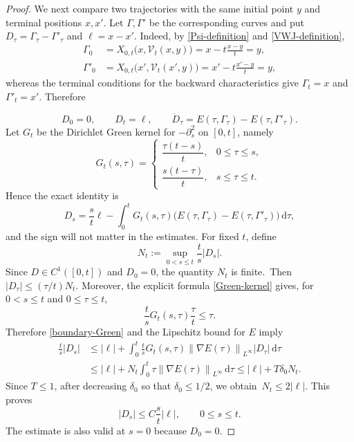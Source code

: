 \documentclass[11pt]{article}
\newcommand{\norm}[1]{\left\lVert #1\right\rVert}
\newcommand{\dd}{\,\mathrm d}
\begin{document}
\begin{proof}
We next compare two trajectories with the same initial point $y$ and terminal
positions $x,x'$.  Let $\Gamma,\Gamma'$ be the corresponding curves and put
$D_\tau=\Gamma_\tau-\Gamma'_\tau$ and $\ell=x-x'$.
Indeed, by \eqref{Psi-definition} and
\eqref{VWJ-definition},
\begin{align*}
 \Gamma_0
 &=X_{0,t}\bigl(x,\mathcal V_t(x,y)\bigr)
   =x-t\frac{x-y}{t}=y,\\
 \Gamma'_0
 &=X_{0,t}\bigl(x',\mathcal V_t(x',y)\bigr)
   =x'-t\frac{x'-y}{t}=y,
\end{align*}
whereas the terminal conditions for the backward characteristics give
$\Gamma_t=x$ and $\Gamma'_t=x'$.  Therefore

\begin{equation*}
 D_0=0,\qquad D_t=\ell,\qquad
 \ddot D_\tau=E(\tau,\Gamma_\tau)-E(\tau,\Gamma'_\tau).
\end{equation*}
Let $G_t$ be the Dirichlet Green kernel for $-\partial_s^2$ on $[0,t]$,
namely
\begin{equation}\label{Green-kernel}
 G_t(s,\tau)=
 \begin{cases}
  \dfrac{\tau(t-s)}{t},&0\leq\tau\leq s,\\[2mm]
  \dfrac{s(t-\tau)}{t},&s\leq\tau\leq t.
 \end{cases}
\end{equation}
Hence the exact identity is
\begin{equation}\label{boundary-Green}
 D_s=\frac{s}{t}\ell-
 \int_0^tG_t(s,\tau)
 \bigl(E(\tau,\Gamma_\tau)-E(\tau,\Gamma'_\tau)\bigr)\dd\tau,
\end{equation}
and the sign will not matter in the estimates.  For fixed $t$, define
\begin{equation*}
 N_t:=\sup_{0<s\leq t}\frac{t}{s}|D_s|.
\end{equation*}
 Since $D\in C^1([0,t])$ and $D_0=0$, the quantity $N_t$ is finite.\
Then $|D_\tau|\leq(\tau/t)N_t$.  Moreover, the explicit formula
\eqref{Green-kernel} gives, for $0<s\leq t$ and $0\leq\tau\leq t$,
\begin{equation*}
 \frac{t}{s}G_t(s,\tau)\frac{\tau}{t}\leq\tau.
\end{equation*}
Therefore \eqref{boundary-Green} and the Lipschitz bound for $E$ imply
 \begin{align*}
 \frac{t}{s}|D_s|
 &\leq |\ell|+\int_0^t\frac{t}{s}G_t(s,\tau)
        \norm{\nabla E(\tau)}_{L^\infty} |D_\tau|\dd\tau\\
 &\leq |\ell|+N_t\int_0^t\tau
        \norm{\nabla E(\tau)}_{L^\infty}\dd\tau
 \leq |\ell|+T\delta_0N_t.
\end{align*} 
 Since $T\leq1$, after decreasing $\delta_0$ so that
$\delta_0\leq1/2$, we obtain\
$N_t\leq2|\ell|$.  This proves
\begin{equation}\label{two-endpoint-position}
 |D_s|\leq C\frac{s}{t}|\ell|,\qquad0\leq s\leq t.
\end{equation}
The estimate is also valid at $s=0$ because $D_0=0$.


\end{proof}
\end{document}
